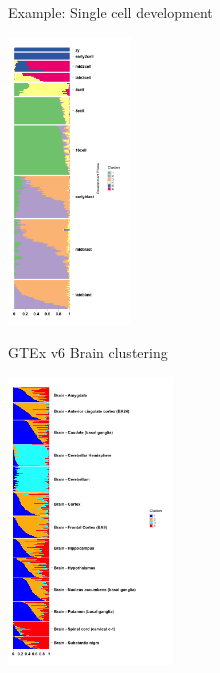 \documentclass{beamer}\usepackage[]{graphicx}\usepackage[]{color}
\begin{document}
\begin{frame}[fragile]{Example: Single cell development \;\;}

\begin{center}
\includegraphics[height=3in]{plot_topic_deng-1.png}
\end{center}

\end{frame}


\begin{frame}[fragile]{GTEx v6 Brain clustering \;\;}

\begin{center}
\includegraphics[height=3in]{gtex_annot-1.png}
\end{center}

\end{frame}
\end{document}
